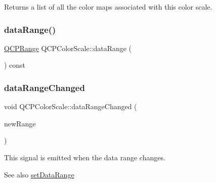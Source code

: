 Returns a list of all the color maps associated with this color scale. \mbox{\label{class_q_c_p_color_scale_a51f5756f99867bd91e570eddefeb1ef4}} 
\subsubsection{\texorpdfstring{data\+Range()}{dataRange()}}
{\footnotesize\ttfamily \hyperlink{class_q_c_p_range}{Q\+C\+P\+Range} Q\+C\+P\+Color\+Scale\+::data\+Range (\begin{DoxyParamCaption}{ }\end{DoxyParamCaption}) const\hspace{0.3cm}{\ttfamily [inline]}}

\mbox{\label{class_q_c_p_color_scale_a685717490a6aa83c5e711a4f34e837f9}} 
\subsubsection{\texorpdfstring{data\+Range\+Changed}{dataRangeChanged}}
{\footnotesize\ttfamily void Q\+C\+P\+Color\+Scale\+::data\+Range\+Changed (\begin{DoxyParamCaption}\item[{const \hyperlink{class_q_c_p_range}{Q\+C\+P\+Range} \&}]{new\+Range }\end{DoxyParamCaption})\hspace{0.3cm}{\ttfamily [signal]}}

This signal is emitted when the data range changes.

\begin{DoxySeeAlso}{See also}
\hyperlink{class_q_c_p_color_scale_abe88633003a26d1e756aa74984587fef}{set\+Data\+Range} 
\end{DoxySeeAlso}
\mbox{\label{class_q_c_p_color_scale_ad864329d93cbd7396af1b2024db7fcfe}} 
